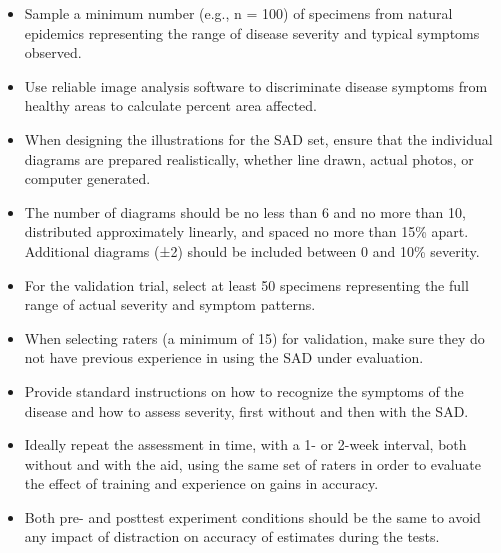 \documentclass[
  letterpaper,
]{book}
\begin{document}
\begin{tcolorbox}[enhanced jigsaw, coltitle=black, colbacktitle=quarto-callout-tip-color!10!white, colframe=quarto-callout-tip-color-frame, title=\textcolor{quarto-callout-tip-color}{\faLightbulb}\hspace{0.5em}{Best practices on SADs development}, arc=.35mm, bottomrule=.15mm, breakable, opacitybacktitle=0.6, toptitle=1mm, titlerule=0mm, bottomtitle=1mm, rightrule=.15mm, opacityback=0, leftrule=.75mm, colback=white, toprule=.15mm, left=2mm]

\begin{itemize}
\item
  Sample a minimum number (e.g., n = 100) of specimens from natural
  epidemics representing the range of disease severity and typical
  symptoms observed.
\item
  Use reliable image analysis software to discriminate disease symptoms
  from healthy areas to calculate percent area affected.
\item
  When designing the illustrations for the SAD set, ensure that the
  individual diagrams are prepared realistically, whether line drawn,
  actual photos, or computer generated.
\item
  The number of diagrams should be no less than 6 and no more than 10,
  distributed approximately linearly, and spaced no more than 15\%
  apart. Additional diagrams (±2) should be included between 0 and 10\%
  severity.
\item
  For the validation trial, select at least 50 specimens representing
  the full range of actual severity and symptom patterns.
\item
  When selecting raters (a minimum of 15) for validation, make sure they
  do not have previous experience in using the SAD under evaluation.
\item
  Provide standard instructions on how to recognize the symptoms of the
  disease and how to assess severity, first without and then with the
  SAD.
\item
  Ideally repeat the assessment in time, with a 1- or 2-week interval,
  both without and with the aid, using the same set of raters in order
  to evaluate the effect of training and experience on gains in
  accuracy.
\item
  Both pre- and posttest experiment conditions should be the same to
  avoid any impact of distraction on accuracy of estimates during the
  tests.
\end{itemize}

\end{tcolorbox}
\end{document}
